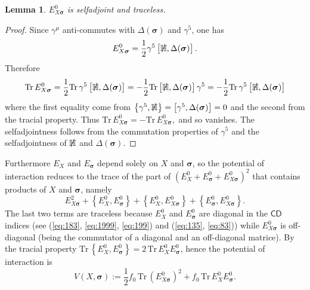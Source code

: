 \documentclass[11pt]{article}
\newcommand{\sig}{{\boldsymbol{\sigma}}}
\newcommand{\sC}{\mathsf C}
\newcommand{\sD}{\mathsf D}
\newtheorem{lemma}[prop]{Lemma}
\begin{document}
\begin{lemma}
\label{lemmexsig} $E^0_{X\sig}$ is selfadjoint and traceless.
\end{lemma}
\begin{proof}
Since  $\gamma^\mu$ anti-commutes with $\Delta(\sig)$ and $\gamma^5$, one has 
\begin{equation}
  \label{eq:90}
  E_{X\sig}^0= \frac 12 \gamma^5  \left[\slashed{\mathbb H}, \Delta(\sig)\right].
\end{equation}
 Therefore 
\begin{equation}
\text{Tr}\, E_{X\sig}^0 = \frac 12 \text{Tr}\, \gamma^5
\left[\slashed{\mathbb H}, \Delta(\sig)\right] = -\frac 12 \text{Tr} 
\left[\slashed{\mathbb H}, \Delta(\sig)\right]\gamma^5 =  -\frac 12 \text{Tr} \,\gamma^5
\left[\slashed{\mathbb H}, \Delta(\sig)\right]
\label{eq:32}
    \end{equation}
  where the first equality come from $\left\{\gamma^5, \slashed {\mathbb H}\right\}= \left[\gamma^5, \Delta(\sig)\right] = 0$ and the second from the tracial
      property. Thus $\text{Tr}\, E_{X\sig}^0  = - \text{Tr}\,
      E_{X\sig}^0,$ and so vanishes. The selfadjointness follows from
      the commutation properties of $\gamma^5$ and the selfadjointness
      of $\slashed{\mathbb H}$ and $\Delta(\sig)$.
\end{proof}
\noindent Furthermore $E_X$ and $E_\sig$ depend solely on $X$ and $\sig$, so the
potential of interaction
reduces to the trace of the part of $(E^0_X + E^0_\sig + E^0_{X\sig})^2$
that contains products of $X$ and $\sig$, namely
\begin{equation}
  \label{eq:44}
E_{X\sig}^2 + \left\{E^0_X, E^0_\sig\right\} +\left\{E^0_X,
  E^0_{X\sig}\right\} +  \left\{E^0_\sig, E^0_{X\sig}\right\}.
\end{equation} 
The last two terms are traceless because $E^0_X$ and $E^0_\sig$ are diagonal in
the $\sC\sD$ indices (see (\ref{eq:183}, \ref{eq:1999}, \ref{eq:199})
and (\ref{eq:135}, \ref{eq:83})) while $E^0_{X\sig}$ is off-diagonal
(being the commutator of a diagonal and an off-diagonal matrice). By the tracial property
$\text{Tr}\, \left\{E^0_X, E^0_\sig\right\}  = 2 \,\text{Tr}\,E^0_X
E^0_\sig$, hence the potential of interaction is 
\begin{equation}
  \label{eq:98}
  V(X,\sig) := \frac 12 f_0 \,\text{Tr}\,(E_{X\sig}^0)^2 +  f_0
    \,\text{Tr}\, E_X^0 E_\sig^0. 
\end{equation}
\end{document}

